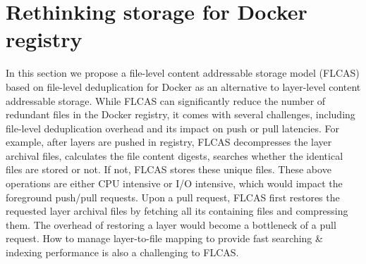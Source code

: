 \section{Rethinking storage for Docker registry}
\label{sec:file_adressable}
%
%
In this section we propose a file-level content addressable storage model (FLCAS)
based on file-level deduplication
for Docker as an alternative to layer-level content addressable storage.
%
%
While FLCAS can significantly reduce the number of redundant files in the Docker
registry, it comes with several challenges, 
including file-level deduplication overhead and its impact on push or pull latencies.
For example, after layers are pushed in registry, FLCAS decompresses the layer archival files,
calculates the file content digests, searches whether the identical files are stored or not. 
If not, FLCAS stores these unique files.
%
These above operations are either CPU intensive or I/O intensive, which would impact 
the foreground push/pull requests.
%
Upon a pull request, FLCAS first restores the requested 
layer archival files by fetching all its containing files and compressing them.
%
The overhead of restoring a layer would become a bottleneck of a pull request.
%
How to manage layer-to-file mapping to provide fast searching \& indexing performance 
is also a challenging to FLCAS.
%
%

